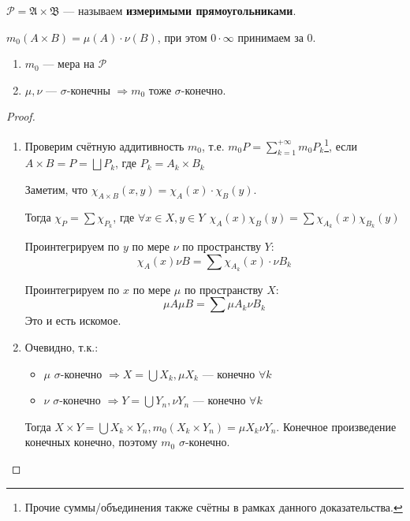 \begin{obozn}
    \(\mathcal{P} = \mathfrak{A} \times \mathfrak{B}\) --- называем \textbf{измеримыми прямоугольниками}.

    \(m_0(A \times B) = \mu(A) \cdot \nu(B)\), при этом \(0 \cdot \infty\) принимаем за \(0\).
\end{obozn}
\begin{theorem}\itemfix
    \begin{enumerate}
        \item \(m_0\) --- мера на \(\mathcal{P}\)
        \item \(\mu, \nu\) --- \(\sigma\)-конечны \( \Rightarrow m_0\) тоже \(\sigma\)-конечно.
    \end{enumerate}
\end{theorem}
\begin{proof}\itemfix
    \begin{enumerate}
        \item Проверим счётную аддитивность \(m_0\), т.е. \(m_0 P = \sum_{k = 1}^{+\infty} m_0 P_k\)\footnote{Прочие суммы/объединения также счётны в рамках данного доказательства.}, если \(A \times B = P = \bigsqcup P_k\), где \(P_k = A_k \times B_k\)

              Заметим, что \(\chi_{A \times B}(x, y) = \chi_A(x) \cdot \chi_B(y)\).

              Тогда \(\chi_P = \sum \chi_{P_k}\), где \(\forall x\in X, y\in Y \ \ \chi_A(x) \chi_B(y) = \sum \chi_{A_k}(x) \chi_{B_k}(y)\)

              Проинтегрируем по \(y\) по мере \(\nu\) по пространству \(Y\):
              \[\chi_A(x) \nu B = \sum \chi_{A_k}(x) \cdot \nu B_k\]

              Проинтегрируем по \(x\) по мере \(\mu\) по пространству \(X\):
              \[\mu A \mu B = \sum \mu A_k \nu B_k\]
              Это и есть искомое.

        \item Очевидно, т.к.:
              \begin{itemize}
                  \item \(\mu\) \(\sigma\)-конечно \( \Rightarrow X = \bigcup X_k, \mu X_k\) --- конечно \(\forall k\)
                  \item \(\nu\) \(\sigma\)-конечно \( \Rightarrow Y = \bigcup Y_n, \nu Y_n\) --- конечно \(\forall k\)
              \end{itemize}

              Тогда \(X \times Y = \bigcup X_k \times Y_n, m_0(X_k \times Y_n) = \mu X_k \nu Y_n\). Конечное произведение конечных конечно, поэтому \(m_0\) \(\sigma\)-конечно.
    \end{enumerate}
\end{proof}

